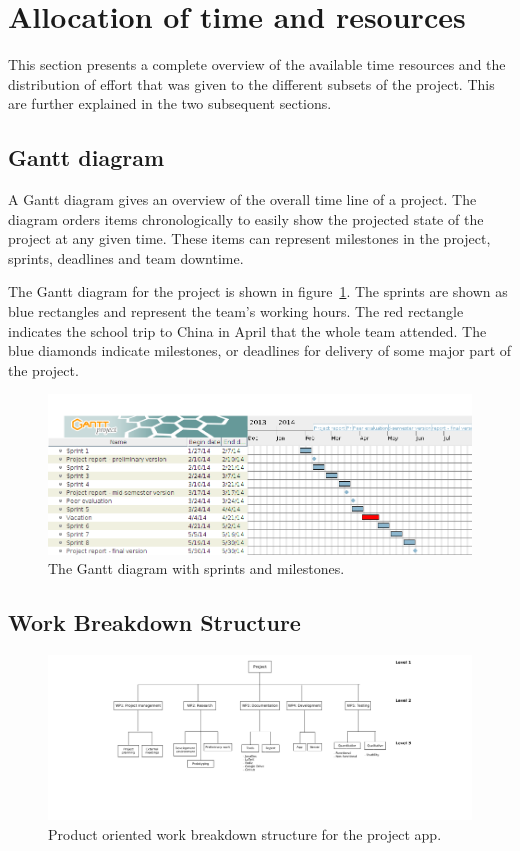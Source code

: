 \section{Allocation of time and resources}
This section presents a complete overview of the available time resources and the distribution of effort that was given to the different subsets of the project. This are further explained in the two subsequent sections.

\subsection{Gantt diagram}
\label{sec:gantt}

A Gantt diagram gives an overview of the overall time line of a project. The diagram orders items chronologically to easily show the projected state of the project at any given time. These items can represent milestones in the project, sprints, deadlines and team downtime. 

The Gantt diagram for the project is shown in figure~\ref{fig:gantt}. The sprints are shown as blue rectangles and represent the team's working hours. The red rectangle indicates the school trip to China in April that the whole team attended. The blue diamonds indicate milestones, or deadlines for delivery of some major part of the project.


\begin{figure}[H]
\includegraphics[width=\textwidth]{ch/projectManagement/fig/gantt.png}
\caption{The Gantt diagram with sprints and milestones.}
\label{fig:gantt}
\end{figure}


\subsection{Work Breakdown Structure}
\label{sec:wbs}

\begin{figure}[H]
\includegraphics[width=\textwidth, trim=9.5cm 6cm 8.5cm 0.9cm,clip]{ch/projectManagement/fig/wbs2.png}
\caption{Product oriented work breakdown structure for the project app.}
\label{fig:wbs}
\end{figure}

